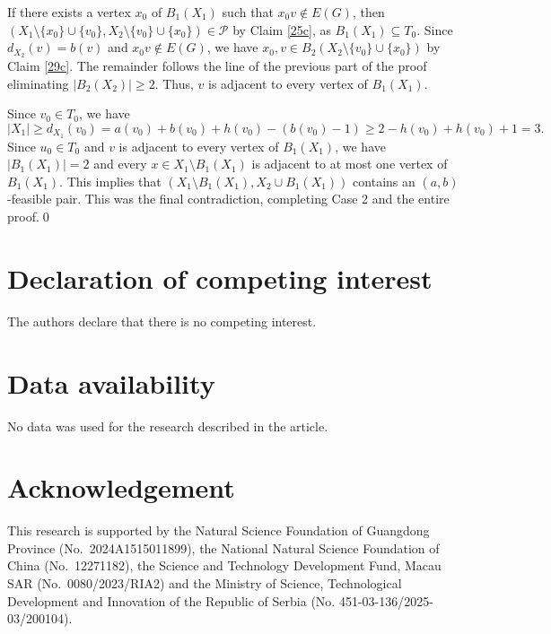 \documentclass[11p]{elsarticle}
\theoremstyle{definition}
\begin{document}
 If
there exists a vertex $x_0$ of $B_1(X_1) $  such that $x_0v\notin E(G)$, then   $(X_1\setminus\{x_0\}\cup\{v_0\}, X_2\setminus\{v_0\}\cup\{x_0\}) \in\mathcal{P} $ by Claim \ref{25c}, as $B_1(X_1)\subseteq T_0$.  Since $ d_{X_2}(v)=b(v)$ and $x_0v\notin E(G)$, we have  $ x_0,v\in B_2(X_2\setminus\{v_0\}\cup\{x_0\})$ by Claim \ref{29c}.  The remainder follows the line of the previous part of the proof eliminating $|B_2(X_2)|\ge 2$. Thus, $v$ is adjacent to every vertex of $B_1(X_1)$. 

  Since $v_0\in T_0$, we have  $$ \left| X_1\right|\ge d_{X_1}(v_0)=a(v_0)+b(v_0)+h(v_0)-(b(v_0)-1)\ge 2-h(v_0)+h(v_0)+1=3.$$  
  Since $u_0\in T_0$ and $v$ is adjacent to every vertex of $B_1(X_1)$, we have $ \left| B_1(X_1)\right|=2$ and every $x\in X_1\setminus B_1(X_1)$ is adjacent to at most one vertex of $B_1(X_1)$. This implies that { $(X_1\setminus B_1(X_1), X_2\cup B_1(X_1))$ contains an $(a,b)$-feasible pair}. This was the final contradiction, completing Case 2 and the entire proof.\qed


\section*{Declaration of competing interest}

	The authors declare that there is no competing interest.

\section*{Data availability}

	No data was used for the research described in the article.
	
	\section*{Acknowledgement} 
	This
	research is supported by the Natural Science Foundation of Guangdong Province 	(No.~2024A1515011899), the National Natural Science Foundation of China (No.~12271182), the Science and Technology Development Fund, Macau SAR (No.~0080/2023/RIA2) and the Ministry of
	Science, Technological Development and Innovation of the Republic of Serbia (No. 451-03-136/2025-03/200104).
	
\end{document}
